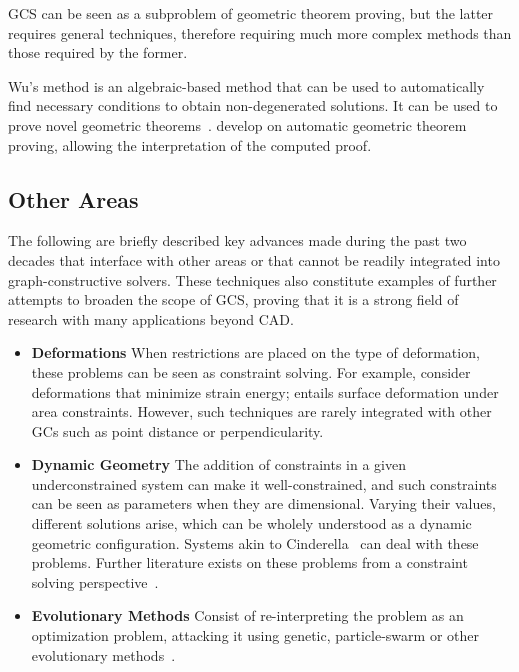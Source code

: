 \ac{GCS} can be seen as a subproblem of geometric theorem proving, but the
latter requires general techniques, therefore requiring much more complex
methods than those required by the former.

Wu's method is an algebraic-based method that can be used to automatically find
necessary conditions to obtain non-degenerated solutions.  It can be used to
prove novel geometric theorems~\cite{Chou:1988:IWMMTPG}.
 develop on automatic geometric
theorem proving, allowing the interpretation of the computed proof.

\subsection{Other Areas}%
\label{sec:intro.constraints.other}

The following are briefly described key advances made during the past two
decades that interface with other areas or that cannot be readily integrated
into graph-constructive solvers.  These techniques also constitute examples of
further attempts to broaden the scope of \ac{GCS}, proving that it is a strong
field of research with many applications beyond \ac{CAD}.

\begin{itemize}
  \item[] \textbf{Deformations} When restrictions are placed on the type of
  deformation, these problems can be seen as constraint solving.  For
  example, \citet{Ahn:2014:GCQBCUML,Bao:2010:BIVCMSE,Moll:2006:PPDLO} consider
  deformations that minimize strain energy;  entails
  surface deformation under area constraints.  However, such techniques are
  rarely integrated with other \acp{GC} such as point distance or
  perpendicularity.
  \item[] \textbf{Dynamic Geometry} The addition of constraints in a given
  underconstrained system can make it well-constrained, and such constraints can
  be seen as parameters when they are dimensional.  Varying their values,
  different solutions arise, which can be wholely understood as a dynamic
  geometric configuration.  Systems akin to
  Cinderella~\cite{Richter:2012:Cinderella.2} can deal with these problems.
  Further literature exists on these problems from a constraint solving
  perspective~\cite{Freixas:2010:CDGS}.
  \item[] \textbf{Evolutionary Methods} Consist of re-interpreting the problem
  as an optimization problem, attacking it using genetic, particle-swarm or
  other evolutionary methods~\cite{Chunhong:2006:PDBOEA,Li:2012:HASPSOASGCP}.
\end{itemize}
